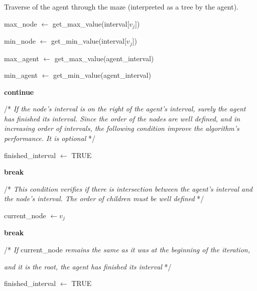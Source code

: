 \begin{algorithm}
\ContinuedFloat
\caption{Traverse of the agent through the maze (interpreted as a tree by the agent).}
\begin{algorithmic}%


\State max\_node $\gets$ get\_max\_value(interval[$v_{j}$])

\State min\_node $\gets$ get\_min\_value(interval[$v_{j}$])

\State max\_agent $\gets$ get\_max\_value(agent\_interval)

\State min\_agent $\gets$ get\_min\_value(agent\_interval)


\State \textbf{continue}


\State /* \textit{If the node's interval is on the right of the agent's interval, surely the}
\State \textit{agent has finished its interval. Since the order of the nodes are well defined,}
\State \textit{and in increasing order of intervals, the following condition improve the}
\State \textit{algorithm's performance. It is optional} */

\State finished\_interval $\gets$ TRUE

\State \textbf{break}


\State /* \textit{This condition verifies if there is intersection between the agent's interval}
\State \textit{and the node's interval. The order of children must be well defined} */

\State current\_node $\gets v_{j}$

\State \textbf{break}

\EndIf

\EndFor

\State

\State /* \textit{If} current\_node \textit{remains the same as it was at the beginning of the iteration,}

\State \textit{and it is the root, the agent has finished its interval} */


\State finished\_interval $\gets$ TRUE


\end{algorithmic}
\end{algorithm}
